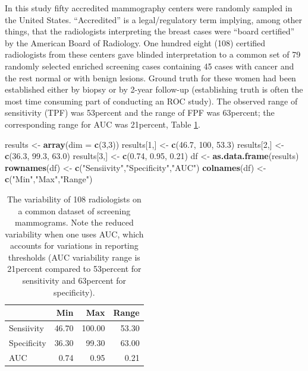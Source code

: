 \documentclass[
]{book}
\newenvironment{Shaded}{\begin{snugshade}}{\end{snugshade}}
\newcommand{\DataTypeTok}[1]{\textcolor[rgb]{0.13,0.29,0.53}{#1}}
\newcommand{\DecValTok}[1]{\textcolor[rgb]{0.00,0.00,0.81}{#1}}
\newcommand{\FloatTok}[1]{\textcolor[rgb]{0.00,0.00,0.81}{#1}}
\newcommand{\KeywordTok}[1]{\textcolor[rgb]{0.13,0.29,0.53}{\textbf{#1}}}
\newcommand{\NormalTok}[1]{#1}
\newcommand{\StringTok}[1]{\textcolor[rgb]{0.31,0.60,0.02}{#1}}
\begin{document}
In this study \citep{RN1087} fifty accredited mammography centers were randomly sampled in the United States. ``Accredited'' is a legal/regulatory term implying, among other things, that the radiologists interpreting the breast cases were ``board certified'' by the American Board of Radiology. One hundred eight (108) certified radiologists from these centers gave blinded interpretation to a common set of 79 randomly selected enriched screening cases containing 45 cases with cancer and the rest normal or with benign lesions. Ground truth for these women had been established either by biopsy or by 2-year follow-up (establishing truth is often the most time consuming part of conducting an ROC study). The observed range of sensitivity (TPF) was 53percent and the range of FPF was 63percent; the corresponding range for AUC was 21percent, Table \ref{tab:binaryTask0BeamStudy}.

\begin{Shaded}
\begin{Highlighting}[]
\NormalTok{results \textless{}{-}}\StringTok{ }\KeywordTok{array}\NormalTok{(}\DataTypeTok{dim =} \KeywordTok{c}\NormalTok{(}\DecValTok{3}\NormalTok{,}\DecValTok{3}\NormalTok{))}
\NormalTok{results[}\DecValTok{1}\NormalTok{,] \textless{}{-}}\StringTok{ }\KeywordTok{c}\NormalTok{(}\FloatTok{46.7}\NormalTok{, }\DecValTok{100}\NormalTok{, }\FloatTok{53.3}\NormalTok{)}
\NormalTok{results[}\DecValTok{2}\NormalTok{,] \textless{}{-}}\StringTok{ }\KeywordTok{c}\NormalTok{(}\FloatTok{36.3}\NormalTok{, }\FloatTok{99.3}\NormalTok{, }\FloatTok{63.0}\NormalTok{)}
\NormalTok{results[}\DecValTok{3}\NormalTok{,] \textless{}{-}}\StringTok{ }\KeywordTok{c}\NormalTok{(}\FloatTok{0.74}\NormalTok{, }\FloatTok{0.95}\NormalTok{, }\FloatTok{0.21}\NormalTok{)}
\NormalTok{df \textless{}{-}}\StringTok{ }\KeywordTok{as.data.frame}\NormalTok{(results)}
\KeywordTok{rownames}\NormalTok{(df) \textless{}{-}}\StringTok{ }\KeywordTok{c}\NormalTok{(}\StringTok{"Sensiivity"}\NormalTok{,}\StringTok{"Specificity"}\NormalTok{,}\StringTok{"AUC"}\NormalTok{)}
\KeywordTok{colnames}\NormalTok{(df) \textless{}{-}}\StringTok{ }\KeywordTok{c}\NormalTok{(}\StringTok{"Min"}\NormalTok{,}\StringTok{"Max"}\NormalTok{,}\StringTok{"Range"}\NormalTok{)}
\end{Highlighting}
\end{Shaded}

\begin{table}

\caption{\label{tab:binaryTask0BeamStudy}The variability of 108 radiologists on a common dataset of screening mammograms. Note the reduced variability when one uses AUC, which accounts for variations in reporting thresholds (AUC variability range is 21percent compared to 53percent for sensitivity and 63percent for specificity).}
\centering
\begin{tabular}[t]{l|r|r|r}
\hline
  & Min & Max & Range\\
\hline
Sensiivity & 46.70 & 100.00 & 53.30\\
\hline
Specificity & 36.30 & 99.30 & 63.00\\
\hline
AUC & 0.74 & 0.95 & 0.21\\
\hline
\end{tabular}
\end{table}
\end{document}
